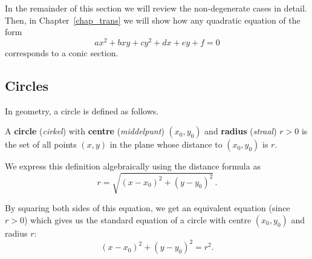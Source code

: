 In the remainder of this section we will review the non-degenerate cases in detail. \ifcourse Then, in Chapter~\ref{chap_trans}  we will show how any quadratic equation of the form
$$
ax^2+bxy+cy^2+dx+ey+f=0
$$
corresponds to a conic section.  \fi


\subsection{Circles}
In geometry, a circle is defined as follows. 


\begin{definition}[Circle] \label{circledefn}
 A \textbf{circle} (\textit{cirkel}) with \textbf{centre} (\textit{middelpunt}) $(x_0,y_0)$ and \textbf{radius} (\textit{straal}) $r>0$ is the set of all points $(x, y)$ in the plane whose distance to $(x_0,y_0)$ is $r$.
   
   
\end{definition} 

We  express this definition algebraically using the distance formula as 
\[r = \sqrt{(x - x_0)^2 + (y-y_0)^2}\,.\] 

By squaring both sides of this equation, we get an equivalent equation (since $r > 0$) which gives us the standard equation of a circle with centre $(x_0,y_0)$ and radius $r$:
\begin{equation}
\label{standardcircle}
(x-x_0)^2 + (y-y_0)^2 = r^2.
\end{equation}



  	
